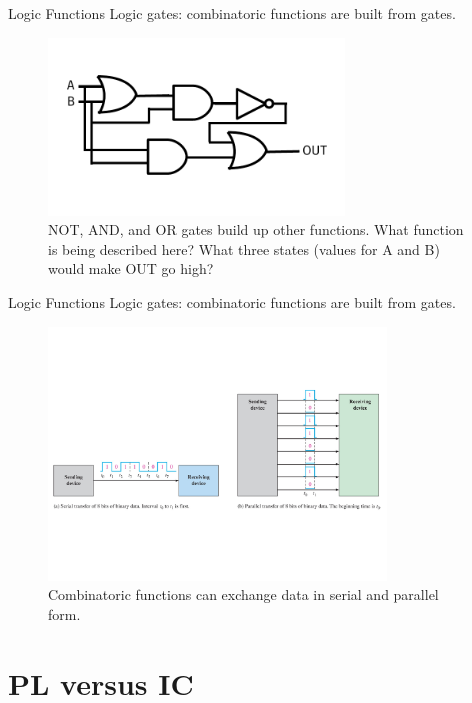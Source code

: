 \documentclass{beamer}
\begin{document}
\begin{frame}{Logic Functions}
Logic gates: combinatoric functions are built from gates.
\begin{figure}
\includegraphics[width=0.7\textwidth]{operators2.pdf}
\caption{\label{fig:digital5} NOT, AND, and OR gates build up other functions.  What function is being described here?  What three states (values for A and B) would make OUT go high?}
\end{figure}
\end{frame}

\begin{frame}{Logic Functions}
Logic gates: combinatoric functions are built from gates.
\begin{figure}
\includegraphics[width=0.8\textwidth,trim=0cm 4cm 0cm 4cm,clip=true]{digital5.pdf}
\caption{\label{fig:digital6} Combinatoric functions can exchange data in serial and parallel form.}
\end{figure}
\end{frame}

\section{PL versus IC}
\end{document}
